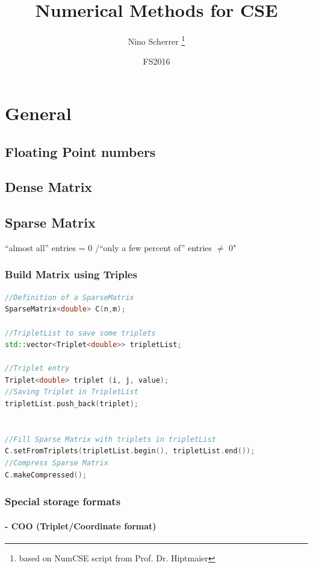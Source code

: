 \documentclass[12pt, a4paper]{article}
\title{Numerical Methods for CSE}
\author{Nino Scherrer \thanks{based on NumCSE script from Prof. Dr. Hiptmaier}}
\date{FS2016}
\begin{document}
\begin{titlepage}
\maketitle
\end{titlepage}
 
 
\section{General}

\subsection{Floating Point numbers}

\subsection{Dense Matrix}


\subsection{Sparse Matrix}
“almost all” entries = 0 /“only a few percent of” entries $\not =$ 0"

\subsubsection{Build Matrix using Triples}

\begin{lstlisting}[language=C++, caption=Triplet example]
//Definition of a SparseMatrix
SparseMatrix<double> C(n,m);

//TripletList to save some triplets
std::vector<Triplet<double>> tripletList;

//Triplet entry
Triplet<double> triplet (i, j, value); 	 
//Saving Triplet in TripletList
tripletList.push_back(triplet);


//Fill Sparse Matrix with triplets in tripletList
C.setFromTriplets(tripletList.begin(), tripletList.end());
//Compress Sparse Matrix
C.makeCompressed();
\end{lstlisting}

\subsubsection{Special storage formats}
\paragraph{- COO (Triplet/Coordinate format)}
\end{document}
